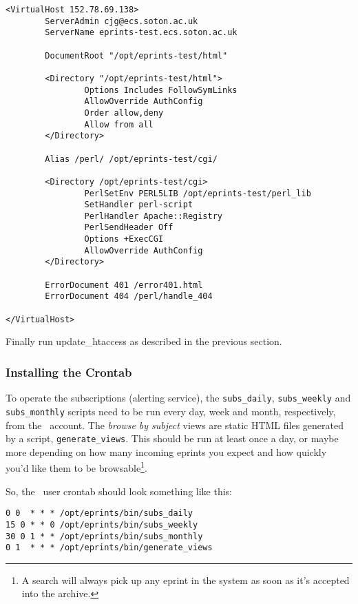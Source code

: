 \begin{verbatim}
<VirtualHost 152.78.69.138>
        ServerAdmin cjg@ecs.soton.ac.uk
        ServerName eprints-test.ecs.soton.ac.uk

        DocumentRoot "/opt/eprints-test/html"

        <Directory "/opt/eprints-test/html">
                Options Includes FollowSymLinks
                AllowOverride AuthConfig
                Order allow,deny
                Allow from all
        </Directory>

        Alias /perl/ /opt/eprints-test/cgi/

        <Directory /opt/eprints-test/cgi>
                PerlSetEnv PERL5LIB /opt/eprints-test/perl_lib
                SetHandler perl-script
                PerlHandler Apache::Registry
                PerlSendHeader Off
                Options +ExecCGI
                AllowOverride AuthConfig
        </Directory>

        ErrorDocument 401 /error401.html
        ErrorDocument 404 /perl/handle_404

</VirtualHost>
\end{verbatim}

Finally run update\_htaccess as described in the previous section. 


\subsubsection{Installing the Crontab}
\label{manual_crontab}

To operate the subscriptions (alerting service), the {\tt subs\_daily}, {\tt subs\_weekly} and {\tt subs\_monthly} scripts need to be run every day, week and month, respectively, from the \eprints\ account. The \emph{browse by subject} views are static HTML files generated by a script, {\tt generate\_views}. This should be run at least once a day, or maybe more depending on how many incoming eprints you expect and how quickly you'd like them to be browsable\footnote{A search will always pick up any eprint in the system as soon as it's accepted into the archive.}.

So, the \eprints\ user crontab should look something like this:

\begin{verbatim}
0 0  * * * /opt/eprints/bin/subs_daily
15 0 * * 0 /opt/eprints/bin/subs_weekly
30 0 1 * * /opt/eprints/bin/subs_monthly
0 1  * * * /opt/eprints/bin/generate_views
\end{verbatim}

